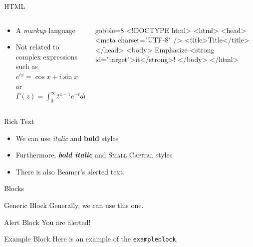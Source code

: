 \documentclass[14pt,t]{beamer}
\begin{document}
\begin{frame}[fragile]{HTML}
  \begin{columns}
    \begin{column}{0.4\textwidth}
      \begin{itemize}
        \item A \emph{markup} language
        \item Not related to complex expressions such as
          $e^{ix} = \cos x + i \sin x$ or
          $\Gamma(z) = \int_0^\infty t^{z-1} e^{-t} dt$
      \end{itemize}
    \end{column}
    \begin{column}{0.6\textwidth}
      \begin{html*}{gobble=8}
        <!DOCTYPE html>
        <html>
          <head>
            <meta charset="UTF-8" />
            <title>Title</title>
          </head>
          <body>
            Emphasize
            <strong id="target">it</strong>!
          </body>
        </html>
      \end{html*}
    \end{column}
  \end{columns}
\end{frame}


\begin{frame}{Rich Text}
  \begin{itemize}
  \item We can use \textit{italic} and \textbf{bold} styles
  \item Furthermore, \textit{\textbf{bold italic}} and \textsc{Small Capital} styles
  \item There is also Beamer's \alert{alerted text}.
  \end{itemize}
\end{frame}


\begin{frame}[fragile]{Blocks}
  \begin{block}{Generic Block}
    Generally, we can use this one.
  \end{block}

  \begin{alertblock}{Alert Block}
    You are alerted!
  \end{alertblock}

  \begin{exampleblock}{Example Block}
    Here is an example of the \verb|exampleblock|.
  \end{exampleblock}
\end{frame}
\end{document}
